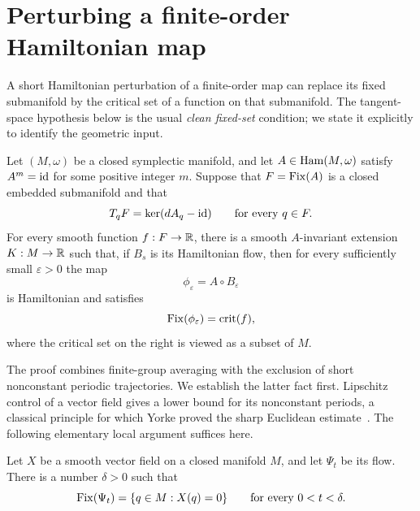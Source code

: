 \section{Perturbing a finite-order Hamiltonian map}
\label{sec:reduction}

A short Hamiltonian perturbation of a finite-order map can replace its
fixed submanifold by the critical set of a function on that submanifold.
The tangent-space hypothesis below is the usual \emph{clean fixed-set}
condition; we state it explicitly to identify the geometric input.

\begin{proposition}
\label{prop:reduction}
Let \((M,\omega)\) be a closed symplectic manifold, and let
\(A\in\operatorname{Ham}(M,\omega)\) satisfy \(A^m=\mathrm{id}\) for some positive integer
\(m\). Suppose that \(F=\operatorname{Fix}(A)\) is a closed embedded submanifold and
that
\[
  T_qF=\ker(dA_q-\mathrm{id})
  \qquad\text{for every }q\in F.
\]
For every smooth function \(f:F\to\mathbb R\), there is a smooth
\(A\)-invariant extension \(K:M\to\mathbb R\) such that, if \(B_s\) is its
Hamiltonian flow, then for every sufficiently small \(\varepsilon>0\)
the map
\[
  \phi_\varepsilon=A\circ B_\varepsilon
\]
is Hamiltonian and satisfies
\[
  \operatorname{Fix}(\phi_\varepsilon)=\operatorname{crit}(f),
\]
where the critical set on the right is viewed as a subset of \(M\).
\end{proposition}

The proof combines finite-group averaging with the exclusion of short
nonconstant periodic trajectories. We establish the latter fact first.
Lipschitz control of a vector field gives a lower bound for its
nonconstant periods, a classical principle for which Yorke proved the
sharp Euclidean estimate~\cite{Yorke1969}. The following elementary
local argument suffices here.

\begin{lemma}
\label{lem:short-periods}
Let \(X\) be a smooth vector field on a closed manifold \(M\), and let
\(\Psi_t\) be its flow. There is a number \(\delta>0\) such that
\[
  \operatorname{Fix}(\Psi_t)=\{q\in M:X(q)=0\}
  \qquad\text{for every }0<t<\delta.
\]
\end{lemma}

